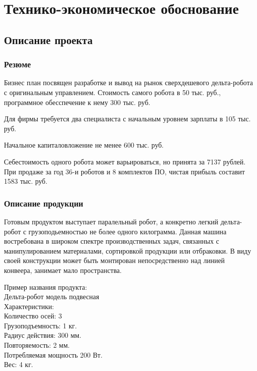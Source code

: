 \section{Технико-экономическое обоснование}
\subsection{Описание проекта}
\subsubsection{Резюме}

Бизнес план посвящен разработке и вывод на рынок сверхдешевого дельта-робота с оригинальным управлением. Стоимость самого робота в 50 тыс. руб., программное обесспечение к нему 300 тыс. руб.

Для фирмы требуется два специалиста с начальным уровнем зарплаты в 105 тыс. руб.

Начальное капиталовложение не менее 600 тыс. руб.

Себестоимость одного робота может варьироваться, но принята за 7137 рублей.
При продаже за год 36-и роботов и 8 комплектов ПО, чистая прибыль составит 1583 тыс. руб. 

\newpage


\subsubsection{Описание продукции}
Готовым продуктом выступает паралельный робот, а конкретно легкий дельта-робот с грузоподьемностью не более одного килограмма. Данная машина востребована в широком спектре производственных задач, связанных с манипулированием материалами, сортировкой продукции или отбраковки. В виду своей конструкции может быть монтирован непосредственно над линией конвеера, занимает мало пространства.

Пример названия продукта:\\
Дельта-робот модель подвесная\\
Характеристики:\\
Количество осей: 3\\
Грузоподъемность: 1 кг.\\
Радиус действия: 300 мм.\\
Повторяемость: 2 мм.\\
Потребляемая мощность 200 Вт.\\
Вес: 4 кг.\\

